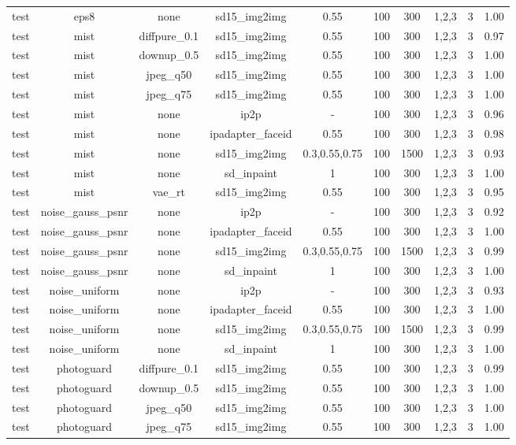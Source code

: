 \begin{table}[t]
{\begin{tabular}{lccccccccc}
test & eps8 & none & sd15\_img2img & 0.55 & 100 & 300 & 1,2,3 & 3 & 1.00 \\
test & mist & diffpure\_0.1 & sd15\_img2img & 0.55 & 100 & 300 & 1,2,3 & 3 & 0.97 \\
test & mist & downup\_0.5 & sd15\_img2img & 0.55 & 100 & 300 & 1,2,3 & 3 & 1.00 \\
test & mist & jpeg\_q50 & sd15\_img2img & 0.55 & 100 & 300 & 1,2,3 & 3 & 1.00 \\
test & mist & jpeg\_q75 & sd15\_img2img & 0.55 & 100 & 300 & 1,2,3 & 3 & 1.00 \\
test & mist & none & ip2p & - & 100 & 300 & 1,2,3 & 3 & 0.96 \\
test & mist & none & ipadapter\_faceid & 0.55 & 100 & 300 & 1,2,3 & 3 & 0.98 \\
test & mist & none & sd15\_img2img & 0.3,0.55,0.75 & 100 & 1500 & 1,2,3 & 3 & 0.93 \\
test & mist & none & sd\_inpaint & 1 & 100 & 300 & 1,2,3 & 3 & 1.00 \\
test & mist & vae\_rt & sd15\_img2img & 0.55 & 100 & 300 & 1,2,3 & 3 & 0.95 \\
test & noise\_gauss\_psnr & none & ip2p & - & 100 & 300 & 1,2,3 & 3 & 0.92 \\
test & noise\_gauss\_psnr & none & ipadapter\_faceid & 0.55 & 100 & 300 & 1,2,3 & 3 & 1.00 \\
test & noise\_gauss\_psnr & none & sd15\_img2img & 0.3,0.55,0.75 & 100 & 1500 & 1,2,3 & 3 & 0.99 \\
test & noise\_gauss\_psnr & none & sd\_inpaint & 1 & 100 & 300 & 1,2,3 & 3 & 1.00 \\
test & noise\_uniform & none & ip2p & - & 100 & 300 & 1,2,3 & 3 & 0.93 \\
test & noise\_uniform & none & ipadapter\_faceid & 0.55 & 100 & 300 & 1,2,3 & 3 & 1.00 \\
test & noise\_uniform & none & sd15\_img2img & 0.3,0.55,0.75 & 100 & 1500 & 1,2,3 & 3 & 0.99 \\
test & noise\_uniform & none & sd\_inpaint & 1 & 100 & 300 & 1,2,3 & 3 & 1.00 \\
test & photoguard & diffpure\_0.1 & sd15\_img2img & 0.55 & 100 & 300 & 1,2,3 & 3 & 0.99 \\
test & photoguard & downup\_0.5 & sd15\_img2img & 0.55 & 100 & 300 & 1,2,3 & 3 & 1.00 \\
test & photoguard & jpeg\_q50 & sd15\_img2img & 0.55 & 100 & 300 & 1,2,3 & 3 & 1.00 \\
test & photoguard & jpeg\_q75 & sd15\_img2img & 0.55 & 100 & 300 & 1,2,3 & 3 & 1.00 \\

\end{tabular}}
\end{table}
